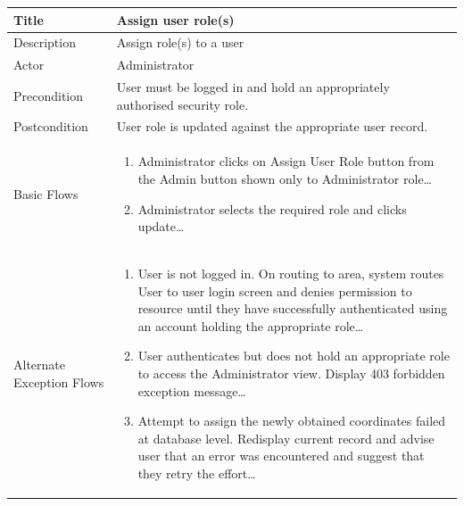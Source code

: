 \documentclass[a4paper,Times New Roman 11pt]{article}
\newcommand\addrow[2]{#1 &#2\\ }
\newcommand\addheading[2]{#1 &#2\\ \hline}
\newcommand\tabularhead{\begin{tabular}{lp{9cm}}
\hline
}
\newcommand\addmulrow[2]{ \begin{minipage}[t][][t]{3cm}#1\end{minipage}%
   &\begin{minipage}[t][][t]{9cm}
    \begin{enumerate} #2   \end{enumerate}
    \end{minipage}\\ }
\newenvironment{usecase}{\tabularhead}
{\hline\end{tabular}}
\begin{document}
\begin{samepage}
\begin{usecase}
    \addheading{Title}{Assign user role(s) }
  \addheading{Description}{Assign role(s) to a user}
  \addheading{Actor}{Administrator} 
  \addrow{Precondition}{User must be logged in and hold an appropriately authorised security role.}
  \addrow{Postcondition}{User role is updated against the appropriate user record.}
  \addmulrow{Basic Flows}{\item Administrator clicks on Assign User Role button from the Admin button shown only to Administrator role\ldots
  \newpage
  \item Administrator selects the required role and clicks update\ldots}
  \addmulrow{Alternate Exception Flows}{\item User is not logged in. On routing to area, system routes User to user login screen and denies permission to resource until they have successfully authenticated using an account holding the appropriate role\ldots
                                                                      \item User authenticates but does not hold an appropriate role to access the Administrator  view. Display 403 forbidden exception message\ldots
                                                                      \item Attempt to assign the newly obtained coordinates failed at database level. Redisplay current record and advise user that an error was encountered and suggest that they retry the effort\ldots}
\end{usecase}


\end{samepage}
\end{document}
